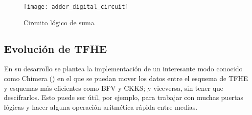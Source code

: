 \begin{figure}[h]
    \centering
    \texttt{[image: adder\_digital\_circuit]}
    \caption{Circuito lógico de suma}
    \label{fig:adder_digital_circuit}
\end{figure}


\subsection{Evolución de TFHE}

En su desarrollo se plantea la implementación de un interesante modo conocido como Chimera (\cite{boura_chimera:_2018}) en el que se puedan mover los datos entre el esquema de TFHE y esquemas más eficientes como BFV y CKKS; y viceversa, sin tener que descifrarlos. Esto puede ser útil, por ejemplo, para trabajar con muchas puertas lógicas y hacer alguna operación aritmética rápida entre medias.
